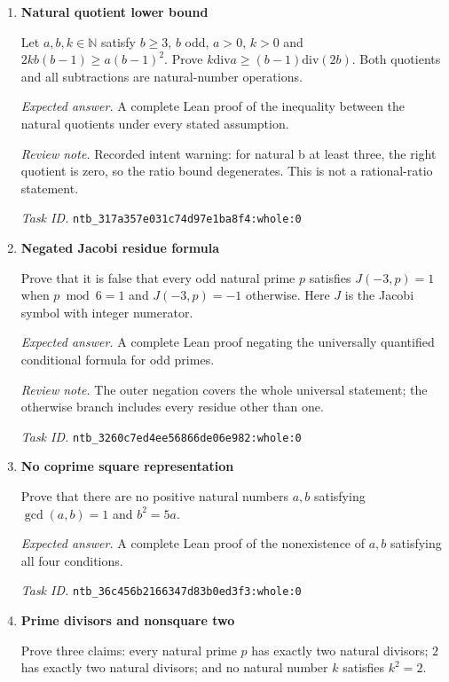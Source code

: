 \documentclass[11pt]{article}
\newcommand{\pth}[1]{\nolinkurl{#1}}
\begin{document}
\begin{enumerate}[label={TEST \arabic*.},leftmargin=4.5em,itemsep=1em]
\emph{Task ID.} \pth{ntb_2c9caaaff14dc84be05601b1:whole:0}

\item \textbf{Natural quotient lower bound}\label{qn:test:16}

Let $a,b,k\in\mathbb{N}$ satisfy $b\ge3$, $b$ odd, $a>0$, $k>0$ and $2kb(b-1)\ge a(b-1)^2$. Prove $k\mathbin{\mathrm{div}}a\ge(b-1)\mathbin{\mathrm{div}}(2b)$. Both quotients and all subtractions are natural-number operations.

\emph{Expected answer.} A complete Lean proof of the inequality between the natural quotients under every stated assumption.

\emph{Review note.} Recorded intent warning: for natural b at least three, the right quotient is zero, so the ratio bound degenerates. This is not a rational-ratio statement.

\emph{Task ID.} \pth{ntb_317a357e031c74d97e1ba8f4:whole:0}

\item \textbf{Negated Jacobi residue formula}\label{qn:test:17}

Prove that it is false that every odd natural prime $p$ satisfies $J(-3,p)=1$ when $p\bmod6=1$ and $J(-3,p)=-1$ otherwise. Here $J$ is the Jacobi symbol with integer numerator.

\emph{Expected answer.} A complete Lean proof negating the universally quantified conditional formula for odd primes.

\emph{Review note.} The outer negation covers the whole universal statement; the otherwise branch includes every residue other than one.

\emph{Task ID.} \pth{ntb_3260c7ed4ee56866de06e982:whole:0}

\item \textbf{No coprime square representation}\label{qn:test:18}

Prove that there are no positive natural numbers $a,b$ satisfying $\gcd(a,b)=1$ and $b^2=5a$.

\emph{Expected answer.} A complete Lean proof of the nonexistence of $a,b$ satisfying all four conditions.

\emph{Task ID.} \pth{ntb_36c456b2166347d83b0ed3f3:whole:0}

\item \textbf{Prime divisors and nonsquare two}\label{qn:test:19}

Prove three claims: every natural prime $p$ has exactly two natural divisors; $2$ has exactly two natural divisors; and no natural number $k$ satisfies $k^2=2$.


\end{enumerate}
\end{document}
